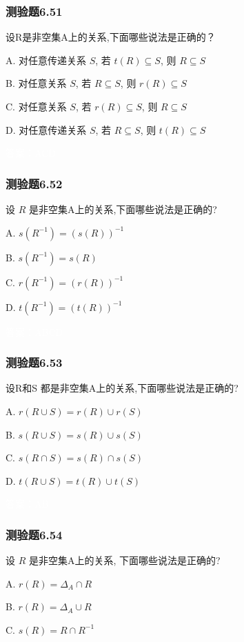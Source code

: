 \documentclass[UTF8, heading=true]{ctexart}
\begin{document}
\subsubsection{测验题6.51}

设R是非空集A上的关系,下面哪些说法是正确的？

A. 对任意传递关系 $S$, 若 $t(R) \subseteq S$, 则 $R \subseteq S$

B. 对任意关系 $S$, 若 $R \subseteq S$, 则 $r(R) \subseteq S$

C. 对任意关系 $S$, 若 $r(R) \subseteq S$, 则 $R \subseteq S$

D. 对任意传递关系 $S$, 若 $R \subseteq S$, 则 $t(R) \subseteq S$

\textcolor{white}{答案：ACD}

\subsubsection{测验题6.52}

设 $R$ 是非空集A上的关系,下面哪些说法是正确的?

A. $s\left(R^{-1}\right)=(s(R))^{-1}$

B. $s\left(R^{-1}\right)=s(R)$

C. $r\left(R^{-1}\right)=(r(R))^{-1}$

D. $t\left(R^{-1}\right)=(t(R))^{-1}$

\textcolor{white}{答案：ABCD}


\subsubsection{测验题6.53}
设R和S 都是非空集A上的关系,下面哪些说法是正确的?

A. $r(R \cup S)=r(R) \cup r(S)$

B. $s(R \cup S)=s(R) \cup s(S)$

C. $s(R \cap S)=s(R) \cap s(S)$

D. $t(R \cup S)=t(R) \cup t(S)$

\textcolor{white}{答案：AB}


\subsubsection{测验题6.54}
设 $R$ 是非空集A上的关系, 下面哪些说法是正确的?

A. $r(R)=\Delta_A \cap R$

B. $r(R)=\Delta_A \cup R$

C. $s(R)=R \cap R^{-1}$
\end{document}
